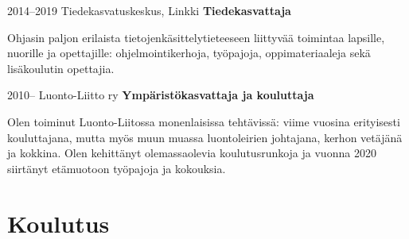 \documentclass{tccv_fin}
\begin{document}
\begin{eventlist}




%	 

\item{2014--2019}
	 {Tiedekasvatuskeskus, Linkki}
	 {\textbf{Tiedekasvattaja}}
	 
Ohjasin paljon erilaista tietojenkäsittelytieteeseen liit\-ty\-vää toimintaa lapsille, nuorille ja opettajille: ohjel\-moin\-ti\-ker\-hoja, työpajoja, oppimateriaaleja sekä li\-sä\-kou\-lu\-tin opet\-tajia. %

	 



\item{2010--}
     {Luonto-Liitto ry}
     {\textbf{Ympäristökasvattaja ja kouluttaja}}

Olen toiminut Luonto-Liitossa mo\-nen\-lai\-sissa tehtävissä: viime vuosina eri\-tyi\-ses\-ti kouluttajana, mutta myös muun muassa luontoleirien johtajana, kerhon vetäjänä ja kok\-ki\-na. Olen kehittänyt olemassaolevia kou\-lu\-tus\-run\-koja ja vuonna 2020 siirtänyt etämuotoon työ\-pa\-joja ja kokouksia.


\end{eventlist}



\section{Koulutus}
\end{document}
